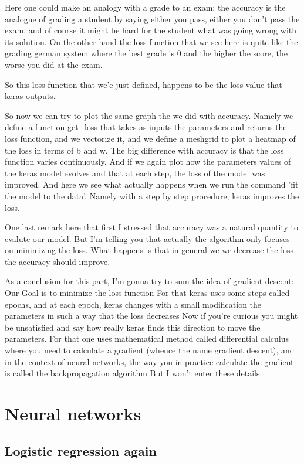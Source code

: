\documentclass{article}
\begin{document}
Here one could make an analogy with a grade to an exam: 
the accuracy is the analogue of grading a student by saying either you pass, 
either you don't pass the exam. 
and of course it might be hard for the student what was going wrong with its solution.
On the other hand the loss function that we see here is quite like the grading german 
system where the best grade is 0 and the higher the score, the worse you did at the exam.

So this loss function that we'e just defined, happens to be the loss value that 
keras outputs.

So now we can try to plot the same graph the we did with accuracy. 
Namely we define a function get\_loss that takes as inputs the parameters and returns 
the loss function, and we vectorize it, and we define a meshgrid to plot a heatmap 
of the loss in terms of b and w.
The big difference with accuracy is that the loss function varies continuously. 
And if we again plot how the parameters values of the keras model evolves and 
that at each step, the loss of the model was improved.
And here we see what actually happens when we run the command 'fit the model to the data'.
Namely with a step by step procedure, keras improves the loss.

One last remark here that first I stressed that accuracy was a natural 
quantity to evalute our model.
But I'm telling you that actually the algorithm only focuses on minimizing the 
loss. 
What happens is that in general we we decrease the loss the accuracy should improve.

As a conclusion for this part, I'm gonna try to sum the idea of gradient descent:
Our Goal is to minimize the loss function
For that keras uses some steps called epochs, and at each epoch, keras changes with a small 
modification the parameters in such a way that the loss decreases
Now if you're curious you might be unsatisfied and say how really keras finds this 
direction to move the parameters.
For that one uses mathematical method called differential calculus 
where you need to calculate a gradient (whence the name gradient descent), 
and in the context of neural networks, the way you 
in practice calculate the gradient is called the backpropagation algorithm
But I won't enter these details.

\section{Neural networks}

\subsection{Logistic regression again}
\end{document}
